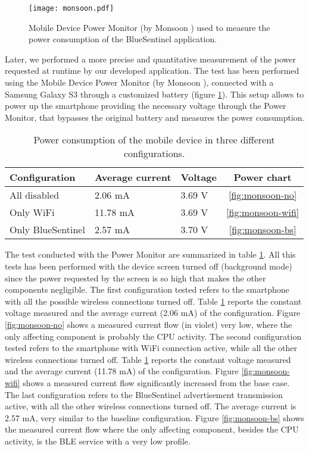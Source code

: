 \begin{figure}[h!tb]
\centering\texttt{[image: monsoon.pdf]}
\caption{Mobile Device Power Monitor (by Monsoon \textregistered) used to measure the power consumption of the BlueSentinel application.}
\label{fig:monsoon}
\end{figure}

Later, we performed a more precise and quantitative measurement of the power requested at runtime by our developed application.
The test has been performed using the Mobile Device Power Monitor (by Monsoon \textregistered), connected with a Samsung Galaxy S3 through a customized battery (figure \ref{fig:monsoon}). This setup allows to power up the smartphone providing the necessary voltage through the Power Monitor, that bypasses the original battery and measures the power consumption.


\begin{table}[h!tb]
\caption{Power consumption of the mobile device in three different configurations.}
\label{tab:monsoon}
\begin{tabular}{|l|l|l|c|}
  \hline
  \textbf{Configuration} & \textbf{Average current} & \textbf{Voltage} & \textbf{Power chart}\\
  \hline
  All disabled & 2.06 mA & 3.69 V & \ref{fig:monsoon-no} \\
  Only WiFi & 11.78 mA & 3.69 V & \ref{fig:monsoon-wifi} \\
  Only BlueSentinel & 2.57 mA & 3.70 V & \ref{fig:monsoon-bs} \\
  \hline
\end{tabular}
\end{table}

The test conducted with the Power Monitor are summarized in table \ref{tab:monsoon}. All this tests has been performed with the device screen turned off (background mode) since the power requested by the screen is so high that makes the other components negligible. The first configuration tested refers to the smartphone with all the possible wireless connections turned off. Table \ref{tab:monsoon} reports the constant voltage measured and the average current (2.06 mA) of the configuration. Figure \ref{fig:monsoon-no} shows a measured current flow (in violet) very low, where the only affecting component is probably the CPU activity.
The second configuration tested refers to the smartphone with WiFi connection active, while all the other wireless connections turned off. Table \ref{tab:monsoon} reports the constant voltage measured and the average current (11.78 mA) of the configuration. Figure \ref{fig:monsoon-wifi} shows a measured current flow significantly increased from the base case. The last configuration refers to the BlueSentinel advertisement transmission active, with all the other wireless connections turned off. The average current is 2.57 mA, very similar to the baseline configuration. Figure \ref{fig:monsoon-bs} shows the measured current flow where the only affecting component, besides the CPU activity, is the BLE service with a very low profile.

